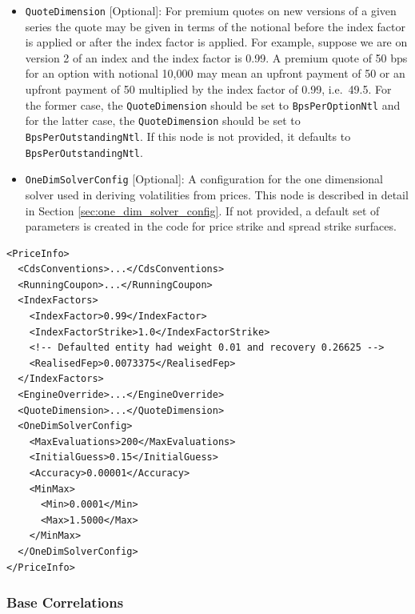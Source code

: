 \begin{itemize}
\item
\lstinline!QuoteDimension! [Optional]: For premium quotes on new versions of a given series the quote may be given in 
terms of the notional before the index factor is applied or after the index factor is applied.
For example, suppose we are on version 2 of an index and the index factor is 0.99. A premium quote of 50 bps for an 
option with notional 10,000 may mean an upfront payment of 50 or an upfront payment of 50 multiplied by the index 
factor of 0.99, i.e.\ 49.5.
For the former case, the \lstinline!QuoteDimension! should be set to \lstinline!BpsPerOptionNtl! and 
for the latter case, the \lstinline!QuoteDimension! should be set to \lstinline!BpsPerOutstandingNtl!.
If this node is not provided, it defaults to \lstinline!BpsPerOutstandingNtl!.

\item
\lstinline!OneDimSolverConfig! [Optional]: A configuration for the one dimensional solver used in deriving volatilities 
from prices. This node is described in detail in Section \ref{sec:one_dim_solver_config}.
If not provided, a default set of parameters is created in the code for price strike and spread strike surfaces.

\end{itemize}

\begin{longlisting}
\begin{verbatim}
<PriceInfo>
  <CdsConventions>...</CdsConventions>
  <RunningCoupon>...</RunningCoupon>
  <IndexFactors>
    <IndexFactor>0.99</IndexFactor>
    <IndexFactorStrike>1.0</IndexFactorStrike>
    <!-- Defaulted entity had weight 0.01 and recovery 0.26625 -->
    <RealisedFep>0.0073375</RealisedFep>
  </IndexFactors>
  <EngineOverride>...</EngineOverride>
  <QuoteDimension>...</QuoteDimension>
  <OneDimSolverConfig>
    <MaxEvaluations>200</MaxEvaluations>
    <InitialGuess>0.15</InitialGuess>
    <Accuracy>0.00001</Accuracy>
    <MinMax>
      <Min>0.0001</Min>
      <Max>1.5000</Max>
    </MinMax>
  </OneDimSolverConfig>
</PriceInfo>
\end{verbatim}
\caption{CDS volatility \lstinline!PriceInfo! node}
\label{lst:cdsvol_price_info}
\end{longlisting}


\subsubsection{Base Correlations}

